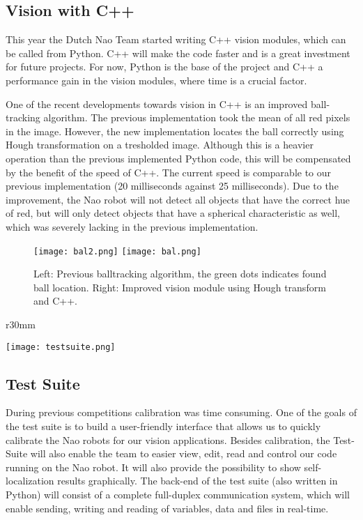 \documentclass[11pt]{article}
\begin{document}
\subsection{Vision with C++}
This year the Dutch Nao Team started writing C++ vision modules, which can be called from Python. C++ will make the code faster and is a great investment for future projects. For now, Python is the base of the project and C++ a performance gain in the vision modules, where time is a crucial factor.

One of the recent developments towards vision in C++ is an improved ball-tracking algorithm. The previous implementation took the mean of all red pixels in the image. However, the new implementation locates the ball correctly using Hough transformation on a tresholded image. Although this is a heavier operation than the previous implemented Python code, this will be compensated by the benefit of the speed of C++. The current speed is comparable to our previous implementation (20 milliseconds against 25 milliseconds). Due to the improvement, the Nao robot will not detect all objects that have the correct hue of red, but will only detect objects that have a spherical characteristic as well, which was severely lacking in the previous implementation.
\begin{figure}[!ht]
  \centering
  \texttt{[image: bal2.png]}
  \texttt{[image: bal.png]}
  \caption{Left: Previous balltracking algorithm, the green dots indicates found ball location. Right: Improved vision module using Hough transform and C++.}
\label{fig:balls}
\end{figure}
\newpage
\begin{wrapfigure}{r}{30mm}
  \begin{center}
    \vspace{-1.5cm}
    \texttt{[image: testsuite.png]}
  \end{center}
\end{wrapfigure}
\subsection{Test Suite}
During previous competitions calibration was time consuming. One of the goals of the test suite is to build a user-friendly interface that allows us to quickly calibrate the Nao robots for our vision applications. Besides calibration, the Test-Suite will also enable the team to easier view, edit, read and control our code running on the Nao robot. It will also provide the possibility to show self-localization results graphically.
The back-end of the test suite (also written in Python) will consist of a complete full-duplex communication system, which will enable sending, writing and reading of variables, data and files in real-time.
\end{document}
